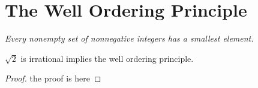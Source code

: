 \chapter{The Well Ordering Principle}

\begin{center}
    \emph{Every nonempty set of nonnegative integers has a smallest element.}
\end{center}

\begin{claim}
    $\sqrt{2}$ is irrational implies the well ordering principle.
\end{claim}

\begin{proof}
    the proof is here
\end{proof}